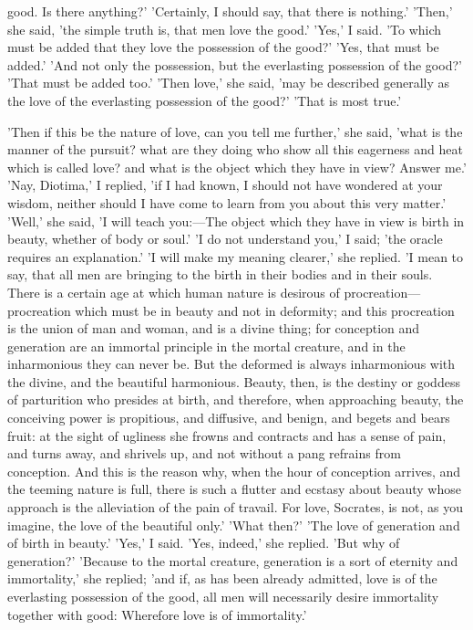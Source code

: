 good. Is there anything?' 'Certainly, I should say, that there is nothing.' 'Then,' she said, 'the simple truth is, that men love the good.' 'Yes,' I said. 'To which must be added that they love the possession of the good?' 'Yes, that must be added.' 'And not only the possession, but the everlasting possession of the good?' 'That must be added too.' 'Then love,' she said, 'may be described generally as the love of the everlasting possession of the good?' 'That is most true.'

\para[117] 'Then if this be the nature of love, can you tell me further,' she said, 'what is the manner of the pursuit? what are they doing who show all this eagerness and heat which is called love? and what is the object which they have in view? Answer me.' 'Nay, Diotima,' I replied, 'if I had known, I should not have wondered at your wisdom, neither should I have come to learn from you about this very matter.' 'Well,' she said, 'I will teach you:---The object which they have in view is birth in beauty, whether of body or soul.' 'I do not understand you,' I said; 'the oracle requires an explanation.' 'I will make my meaning clearer,' she replied. 'I mean to say, that all men are bringing to the birth in their bodies and in their souls. There is a certain age at which human nature is desirous of procreation---procreation which must be in beauty and not in deformity; and this procreation is the union of man and woman, and is a divine thing; for conception and generation are an immortal principle in the mortal creature, and in the inharmonious they can never be. But the deformed is always inharmonious with the divine, and the beautiful harmonious. Beauty, then, is the destiny or goddess of parturition who presides at birth, and therefore, when approaching beauty, the conceiving power is propitious, and diffusive, and benign, and begets and bears fruit: at the sight of ugliness she frowns and contracts and has a sense of pain, and turns away, and shrivels up, and not without a pang refrains from conception. And this is the reason why, when the hour of conception arrives, and the teeming nature is full, there is such a flutter and ecstasy about beauty whose approach is the alleviation of the pain of travail. For love, Socrates, is not, as you imagine, the love of the beautiful only.' 'What then?' 'The love of generation and of birth in beauty.' 'Yes,' I said. 'Yes, indeed,' she replied. 'But why of generation?' 'Because to the mortal creature, generation is a sort of eternity and immortality,' she replied; 'and if, as has been already admitted, love is of the everlasting possession of the good, all men will necessarily desire immortality together with good: Wherefore love is of immortality.'

